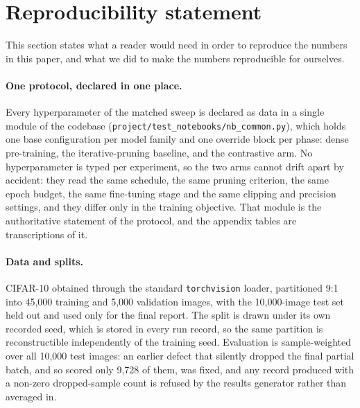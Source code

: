 %
%

\section{Reproducibility statement}
\label{sec:stmt:reproducibility}

This section states what a reader would need in order to reproduce the numbers
in this paper, and what we did to make the numbers reproducible for ourselves.

\paragraph{One protocol, declared in one place.}
Every hyperparameter of the matched sweep is declared as data in a single
module of the codebase (\texttt{project/test\_notebooks/nb\_common.py}), which
holds one base configuration per model family and one override block per phase:
dense pre-training, the iterative-pruning baseline, and the contrastive arm.
No hyperparameter is typed per experiment, so the two arms cannot drift apart
by accident: they read the same schedule, the same pruning criterion, the same
epoch budget, the same fine-tuning stage and the same clipping and precision
settings, and they differ only in the training objective. That module is the
authoritative statement of the protocol, and the appendix tables are
transcriptions of it.

\paragraph{Data and splits.}
CIFAR-10 obtained through the standard \texttt{torchvision} loader, partitioned
9:1 into 45{,}000 training and 5{,}000 validation images, with the 10{,}000-image
test set held out and used only for the final report. The split is drawn under
its own recorded seed, which is stored in every run record, so the same
partition is reconstructible independently of the training seed. Evaluation is
sample-weighted over all 10{,}000 test images: an earlier defect that silently
dropped the final partial batch, and so scored only 9{,}728 of them, was fixed,
and any record produced with a non-zero dropped-sample count is refused by the
results generator rather than averaged in.

